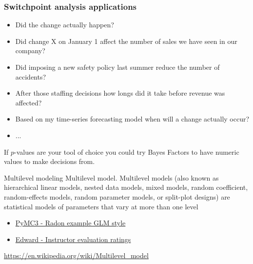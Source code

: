 \documentclass[table,dvipsnames]{beamer}
\begin{document}
\begin{frame}[fragile]
\frametitle{Switchpoint analysis applications}
\begin{block}{}
\begin{itemize}
 \item Did the change actually happen?
 \item Did change X on January 1 affect the number of sales we have seen in our company?
 \item Did imposing a new safety policy last summer reduce the number of accidents?
 \item After those staffing decisions how longs did it take before revenue was affected?
 \item Based on my time-series forecasting model when will a change actually occur?
 \item ...
\end{itemize}
\end{block}
\begin{block}{}
If $p$-values are your tool of choice you could try Bayes Factors to have numeric values to make decisions from.
\end{block}
\end{frame}

\begin{frame}[fragile]
\begin{block}{Multilevel modeling}
Multilevel model. Multilevel models (also known as hierarchical linear models, nested data models, mixed models, random coefficient, random-effects models, random parameter models, or split-plot designs) are statistical models of parameters that vary at more than one level
\end{block}
\vspace{1cm}
\begin{itemize}
 \item \href{http://twiecki.github.io/blog/2014/03/17/bayesian-glms-3/}{PyMC3 - Radon example GLM style}
 \item \href{http://edwardlib.org/tutorials/linear-mixed-effects-models}{Edward - Instructor evaluation ratings}
\end{itemize}
\vspace{1cm}
\href{https://en.wikipedia.org/wiki/Multilevel\_model}{https://en.wikipedia.org/wiki/Multilevel\_model}
\end{frame}
\end{document}
